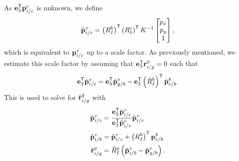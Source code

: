 As $\boldsymbol{\mathrm{e}}_3^{\mathsf{T}} \boldsymbol{\mathrm{p}}_{i/c}^c$ is unknown, we define 
\begin{equation}
  \accentset{\circ}{\boldsymbol{\mathrm{p}}}_{i/c}^v
  =
   \left( R_I^b
  \right)^{\mathsf{T}} \left( R_b^c \right)^{\mathsf{T}} K^{-1} \begin{bmatrix}
    p_x \\ p_y \\ 1
  \end{bmatrix},
\end{equation}
which is equivalent to $\boldsymbol{\mathrm{p}}_{i/c}^v$ up to a scale factor. As previously
mentioned, we estimate this scale factor by assuming that $\boldsymbol{\mathrm{e}}_3^{\mathsf{T}}
\boldsymbol{\mathrm{r}}_{i/g}^g = 0$ such that
\begin{equation}
  \boldsymbol{\mathrm{e}}_3^{\mathsf{T}} \hat{\boldsymbol{\mathrm{p}}}_{i/c}^v = \boldsymbol{\mathrm{e}}_3^{\mathsf{T}} \hat{\boldsymbol{\mathrm{p}}}_{g/b}^v -
  \boldsymbol{\mathrm{e}}_3^{\mathsf{T}} \left( \hat{R}_I^b \right)^{\mathsf{T}} \hat{\boldsymbol{\mathrm{p}}}_{c/b}^b.
\end{equation}
This is used to solve for $\hat{\boldsymbol{\mathrm{r}}}_{i/g}^g$ with
\begin{align}
  \hat{\boldsymbol{\mathrm{p}}}_{i/c}^v &= \frac{\boldsymbol{\mathrm{e}}_3^{\mathsf{T}}
  \hat{\boldsymbol{\mathrm{p}}}_{i/c}^v}{\boldsymbol{\mathrm{e}}_3^{\mathsf{T}} \accentset{\circ}{\boldsymbol{\mathrm{p}}}_{i/c}^v} \accentset{\circ}{\boldsymbol{\mathrm{p}}}_{i/c}^v
  \\
    \hat{\boldsymbol{\mathrm{p}}}_{i/b}^v &= \hat{\boldsymbol{\mathrm{p}}}_{i/c}^v + \left( R_I^b \right)^{\mathsf{T}} \boldsymbol{\mathrm{p}}_{c/b}^b \\
    \hat{\boldsymbol{\mathrm{r}}}_{i/g}^g &= \hat{R}_I^g \left( \hat{\boldsymbol{\mathrm{p}}}_{i/b}^v -
    \hat{\boldsymbol{\mathrm{p}}}_{g/b}^v \right).
\end{align}

